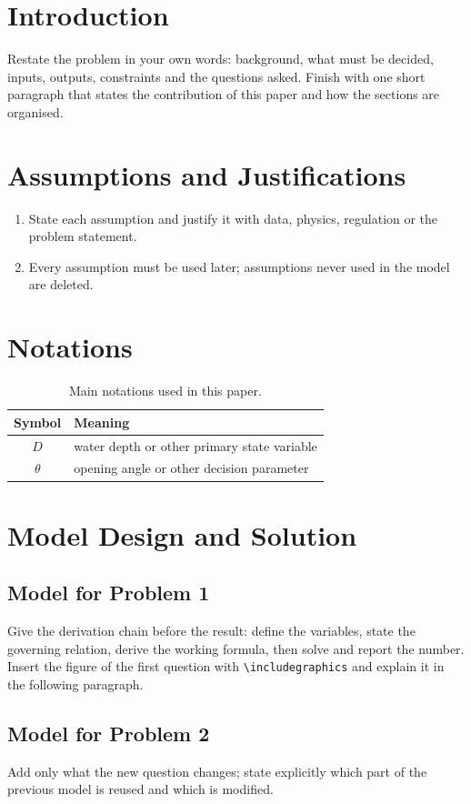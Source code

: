 \documentclass[12pt,letterpaper]{article}
\begin{document}
\section{Introduction}
Restate the problem in your own words: background, what must be decided, inputs, outputs, constraints and the questions asked. Finish with one short paragraph that states the contribution of this paper and how the sections are organised.

\section{Assumptions and Justifications}
\begin{enumerate}
    \item State each assumption and justify it with data, physics, regulation or the problem statement.
    \item Every assumption must be used later; assumptions never used in the model are deleted.
\end{enumerate}

\section{Notations}
\begin{table}[H]
\centering
\begin{tabular}{cl}
\toprule
Symbol & Meaning \\
\midrule
$D$ & water depth or other primary state variable \\
$\theta$ & opening angle or other decision parameter \\
\bottomrule
\end{tabular}
\caption{Main notations used in this paper.}
\end{table}

\section{Model Design and Solution}
\subsection{Model for Problem 1}
Give the derivation chain before the result: define the variables, state the governing relation, derive the working formula, then solve and report the number. Insert the figure of the first question with \verb|\includegraphics| and explain it in the following paragraph.

\subsection{Model for Problem 2}
Add only what the new question changes; state explicitly which part of the previous model is reused and which is modified.
\end{document}
